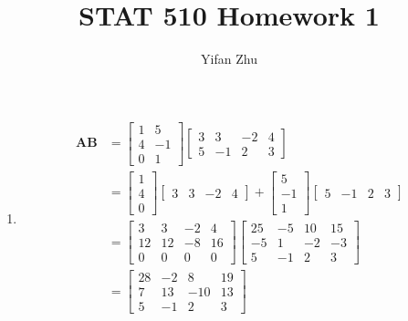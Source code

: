 \documentclass{article}
\begin{document}
	

	
	\title{STAT 510 Homework 1}
	\author{Yifan Zhu}
	\maketitle
	
	\begin{enumerate}[leftmargin = 0 em, label = \arabic*., font = \bfseries]
	\item 
	\begin{align*}
	\bm A \bm B & = \begin{bmatrix}
		1 & 5 \\
		4 & -1\\
		0 & 1	
	\end{bmatrix}
	\begin{bmatrix}
		3 & 3 & -2 & 4\\
		5 & -1 & 2 & 3
	\end{bmatrix}\\
	& = \begin{bmatrix}
		1 \\ 4 \\ 0
	\end{bmatrix}
	\begin{bmatrix}
		3 & 3 & -2 & 4
	\end{bmatrix} +
	\begin{bmatrix}
		5 \\ -1 \\ 1
	\end{bmatrix} \begin{bmatrix}
		5 & -1 & 2 & 3
	\end{bmatrix}\\
	& = \begin{bmatrix}
		3 & 3 & -2 & 4\\
		12 & 12 & -8 & 16\\
		0 & 0 & 0& 0
	\end{bmatrix}
		\begin{bmatrix}
			25 & -5 & 10 & 15\\
			-5 & 1 & -2 & -3\\
			5 & -1 & 2 & 3
		\end{bmatrix}\\
		& = \begin{bmatrix}
			28 & -2 & 8 & 19\\
			7 & 13 & -10 & 13\\
			5 & -1 & 2 & 3
		\end{bmatrix}\\
	\end{align*}
	


\end{enumerate}
\end{document}
